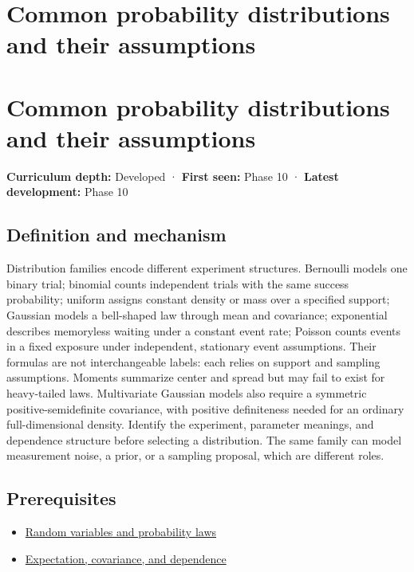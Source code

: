 \hypertarget{appendix-a2360b435383}{}
\section*{Common probability distributions and their assumptions}
\section{Common probability distributions and their assumptions}\label{appendix-a2360b435383-common-probability-distributions-and-their-assumptions}

\textbf{Curriculum depth:} Developed · \textbf{First seen:} Phase 10 · \textbf{Latest development:} Phase 10

\subsection{Definition and mechanism}\label{appendix-a2360b435383-definition-and-mechanism}

Distribution families encode different experiment structures. Bernoulli models one binary trial; binomial counts independent trials with the same success probability; uniform assigns constant density or mass over a specified support; Gaussian models a bell-shaped law through mean and covariance; exponential describes memoryless waiting under a constant event rate; Poisson counts events in a fixed exposure under independent, stationary event assumptions. Their formulas are not interchangeable labels: each relies on support and sampling assumptions. Moments summarize center and spread but may fail to exist for heavy-tailed laws. Multivariate Gaussian models also require a symmetric positive-semidefinite covariance, with positive definiteness needed for an ordinary full-dimensional density. Identify the experiment, parameter meanings, and dependence structure before selecting a distribution. The same family can model measurement noise, a prior, or a sampling proposal, which are different roles.

\subsection{Prerequisites}\label{appendix-a2360b435383-prerequisites}

\begin{itemize}
\tightlist
\item
  \hyperref[appendix-4d0203f7944f]{Random variables and probability laws}
\item
  \hyperref[appendix-54c383df9992]{Expectation, covariance, and dependence}
\end{itemize}

